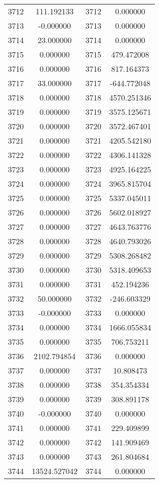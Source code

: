 \documentclass[12pt]{article}
\begin{document}
\begin{longtable}{@{}cccc@{}}
3712 & 111.192133 & 3712 & 0.000000 \\
3713 & -0.000000 & 3713 & 0.000000 \\
3714 & 23.000000 & 3714 & 0.000000 \\
3715 & 0.000000 & 3715 & 479.472008 \\
3716 & 0.000000 & 3716 & 817.164373 \\
3717 & 33.000000 & 3717 & -644.772048 \\
3718 & 0.000000 & 3718 & 4570.251346 \\
3719 & 0.000000 & 3719 & 3575.125671 \\
3720 & 0.000000 & 3720 & 3572.467401 \\
3721 & 0.000000 & 3721 & 4205.542180 \\
3722 & 0.000000 & 3722 & 4306.141328 \\
3723 & 0.000000 & 3723 & 4925.164225 \\
3724 & 0.000000 & 3724 & 3965.815704 \\
3725 & 0.000000 & 3725 & 5337.045011 \\
3726 & 0.000000 & 3726 & 5602.018927 \\
3727 & 0.000000 & 3727 & 4643.763776 \\
3728 & 0.000000 & 3728 & 4640.793026 \\
3729 & 0.000000 & 3729 & 5308.268482 \\
3730 & 0.000000 & 3730 & 5318.409653 \\
3731 & 0.000000 & 3731 & 452.194236 \\
3732 & 50.000000 & 3732 & -246.603329 \\
3733 & -0.000000 & 3733 & 0.000000 \\
3734 & 0.000000 & 3734 & 1666.055834 \\
3735 & 0.000000 & 3735 & 706.753211 \\
3736 & 2102.794854 & 3736 & 0.000000 \\
3737 & 0.000000 & 3737 & 10.808473 \\
3738 & 0.000000 & 3738 & 354.354334 \\
3739 & 0.000000 & 3739 & 308.891178 \\
3740 & -0.000000 & 3740 & 0.000000 \\
3741 & 0.000000 & 3741 & 229.409899 \\
3742 & 0.000000 & 3742 & 141.909469 \\
3743 & 0.000000 & 3743 & 261.804684 \\
3744 & 13524.527042 & 3744 & 0.000000 \\

\end{longtable}
\end{document}
